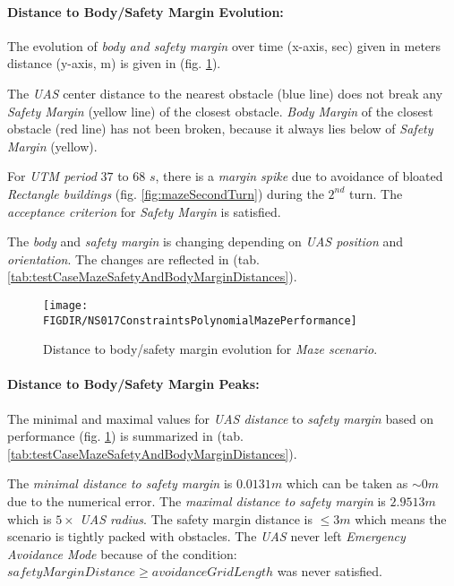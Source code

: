 \paragraph{Distance to Body/Safety Margin Evolution:}  The evolution of \emph{body and safety margin} over time (x-axis, sec) given in  meters distance (y-axis, m) is given in (fig. \ref{fig:testCaseMazeAvoidancePerformance}).

The \emph{UAS} center distance to the nearest obstacle (blue line) does not break any \emph{Safety Margin} (yellow line) of the closest obstacle. \emph{Body Margin} of the closest obstacle (red line) has not been broken, because it always lies below of \emph{Safety Margin} (yellow).

For \emph{UTM period} $37$ to $68$ $s$, there is a \emph{margin spike}  due to avoidance of bloated \emph{Rectangle buildings} (fig. \ref{fig:mazeSecondTurn}) during the $2^{nd}$ turn. The \emph{acceptance criterion} for \emph{Safety Margin} is satisfied.

\begin{note}
The \emph{body} and \emph{safety margin} is changing  depending on \emph{UAS position} and \emph{orientation}. The changes are reflected in (tab. \ref{tab:testCaseMazeSafetyAndBodyMarginDistances}).
\end{note}


\begin{figure}[H]
    \centering
    \texttt{[image: \\FIGDIR/NS017ConstraintsPolynomialMazePerformance]} 
    \caption{Distance to body/safety margin evolution for \emph{Maze scenario}.}
    \label{fig:testCaseMazeAvoidancePerformance}
\end{figure}

\paragraph{Distance to Body/Safety Margin Peaks:} The minimal and maximal values for \emph{UAS distance} to \emph{safety margin} based on performance (fig. \ref{fig:testCaseMazeAvoidancePerformance}) is summarized in (tab. \ref{tab:testCaseMazeSafetyAndBodyMarginDistances}).

The \emph{minimal distance to safety margin} is $0.0131 m$ which can be taken as $\sim 0m$ due to the numerical error. The \emph{maximal distance to safety margin} is $2.9513 m$ which is $5 \times$ \emph{UAS radius}. The safety margin distance is $\le 3 m$ which means the scenario is tightly packed with obstacles. The \emph{UAS} never left \emph{Emergency Avoidance Mode} because of the condition: $safety Margin Distance \ge avoidance Grid Length$ was never satisfied. 

